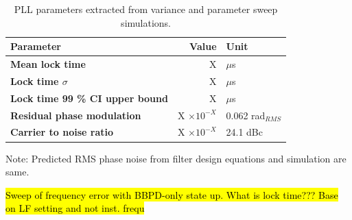		\begin{table}[h!]
			\centering
			\def\arraystretch{1.5}		
			\setlength\arrayrulewidth{0.75pt}
			\setlength{\tabcolsep}{1em} %
			\begin{tabular}{|l|r|l|}
				\hline 
				\rule[-1ex]{0pt}{2.5ex} \cellcolor{gray!40}\textbf{Parameter} & \cellcolor{gray!40}\textbf{Value} & \cellcolor{gray!40}\textbf{Unit }\\ 
				\hline 
				\rule[-1ex]{0pt}{2.5ex} \textbf{Mean lock time}  & X& $\mu$s \\
				\hline 
				\rule[-1ex]{0pt}{2.5ex} \textbf{Lock time $\sigma$} &X & $\mu$s\\ 
				\hline 
				\rule[-1ex]{0pt}{2.5ex} \textbf{Lock time 99 \% CI upper bound} & X & $\mu$s\\
				\hline 
				\rule[-1ex]{0pt}{2.5ex} \textbf{Residual phase modulation} & X $\times10^{-X}$ & 0.062 rad$_{RMS}$\\ 
				\hline 
				\rule[-1ex]{0pt}{2.5ex} \textbf{Carrier to noise ratio} & X $\times10^{-X}$ & 24.1 dBc\\ 
				\hline 
			\end{tabular} 

			\caption{PLL parameters extracted from variance and parameter sweep simulations.}
			\label{simulation_params_fast}
		\end{table}
		Note: Predicted RMS phase noise from filter design equations and simulation are same.

		\hl{Sweep of frequency error with BBPD-only state up. What is lock time??? Base on LF setting and not inst. frequ}



